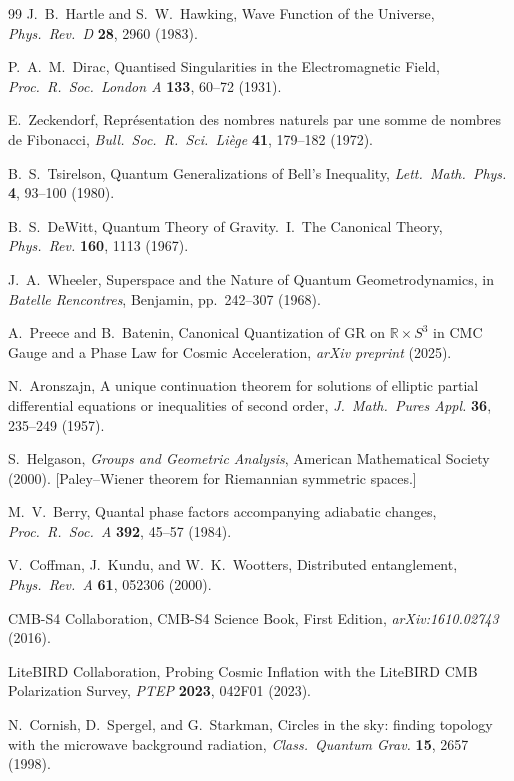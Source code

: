 \documentclass[12pt,a4paper]{article}
\theoremstyle{definition}
\theoremstyle{remark}
\begin{document}
\begin{thebibliography}{99}
J.~B.~Hartle and S.~W.~Hawking, Wave Function of the Universe,
\textit{Phys.\ Rev.\ D} \textbf{28}, 2960 (1983).

P.~A.~M.~Dirac, Quantised Singularities in the Electromagnetic Field,
\textit{Proc.\ R.\ Soc.\ London A} \textbf{133}, 60--72 (1931).

E.~Zeckendorf, Repr\'esentation des nombres naturels par une somme de nombres de
Fibonacci, \textit{Bull.\ Soc.\ R.\ Sci.\ Li\`ege} \textbf{41}, 179--182 (1972).

B.~S.~Tsirelson, Quantum Generalizations of Bell's Inequality,
\textit{Lett.\ Math.\ Phys.} \textbf{4}, 93--100 (1980).

B.~S.~DeWitt, Quantum Theory of Gravity.\ I.\ The Canonical Theory,
\textit{Phys.\ Rev.} \textbf{160}, 1113 (1967).

J.~A.~Wheeler, Superspace and the Nature of Quantum Geometrodynamics, in
\textit{Batelle Rencontres}, Benjamin, pp.~242--307 (1968).

A.~Preece and B.~Batenin, Canonical Quantization of GR on $\mathbb{R}\times S^3$
in CMC Gauge and a Phase Law for Cosmic Acceleration,
\textit{arXiv preprint} (2025).

N.~Aronszajn, A unique continuation theorem for solutions of elliptic partial
differential equations or inequalities of second order,
\textit{J.\ Math.\ Pures Appl.} \textbf{36}, 235--249 (1957).

S.~Helgason, \textit{Groups and Geometric Analysis}, American Mathematical Society
(2000). [Paley--Wiener theorem for Riemannian symmetric spaces.]

M.~V.~Berry, Quantal phase factors accompanying adiabatic changes,
\textit{Proc.\ R.\ Soc.\ A} \textbf{392}, 45--57 (1984).

V.~Coffman, J.~Kundu, and W.~K.~Wootters, Distributed entanglement,
\textit{Phys.\ Rev.\ A} \textbf{61}, 052306 (2000).

CMB-S4 Collaboration, CMB-S4 Science Book, First Edition,
\textit{arXiv:1610.02743} (2016).

LiteBIRD Collaboration, Probing Cosmic Inflation with the LiteBIRD CMB Polarization
Survey, \textit{PTEP} \textbf{2023}, 042F01 (2023).

N.~Cornish, D.~Spergel, and G.~Starkman, Circles in the sky: finding topology with
the microwave background radiation,
\textit{Class.\ Quantum Grav.} \textbf{15}, 2657 (1998).


\end{thebibliography}
\end{document}
